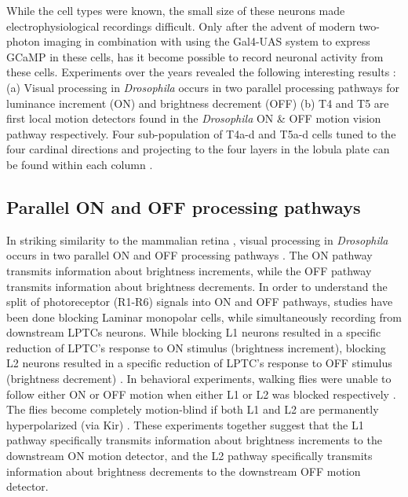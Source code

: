 While the cell types were known, the small size of these neurons made electrophysiological recordings difficult. Only after the advent of modern two-photon imaging in combination with using the Gal4-UAS system to express GCaMP in these cells, has it become possible to record neuronal activity from these cells. Experiments over the years revealed the following interesting results : (a) Visual processing in \textit{Drosophila} occurs in two parallel processing pathways for luminance increment (ON) and brightness decrement (OFF) \parencite{Joesch2010, Joesch2013, Strother2014, Eichner2011, Behnia2014, Shinomiya2014} (b) T4 and T5 are first local motion detectors found in the \textit{Drosophila} ON \& OFF motion vision pathway respectively. Four sub-population of T4a-d and T5a-d cells tuned to the four cardinal directions and projecting to the four layers in the lobula plate can be found within each column \parencite{Maisak2013}. 


\subsection{Parallel ON and OFF processing pathways}
In striking similarity to the mammalian retina \parencite{Masland2012}, visual processing in \textit{Drosophila} occurs in two parallel ON and OFF processing pathways \parencite{Borst2015}. The ON pathway transmits information about brightness increments, while the OFF pathway transmits information about brightness decrements. In order to understand the split of photoreceptor (R1-R6) signals into ON and OFF pathways, studies have been done blocking Laminar monopolar cells, while simultaneously recording from downstream LPTCs neurons. While blocking L1 neurons resulted in a specific reduction of LPTC's response to ON stimulus (brightness increment), blocking L2 neurons resulted in a specific reduction of LPTC's response to OFF stimulus (brightness decrement) \parencite{Joesch2010}. In behavioral experiments, walking flies were unable to follow either ON or OFF motion when either L1 or L2 was blocked respectively \parencite{Clark2011}. The flies become completely motion-blind if both L1 and L2 are permanently hyperpolarized (via Kir) \parencite{Tuthill2013, Bahl2013}. These experiments together suggest that the L1 pathway specifically transmits information about brightness increments to the downstream ON motion detector, and the L2 pathway specifically transmits information about brightness decrements to the downstream OFF motion detector. 

